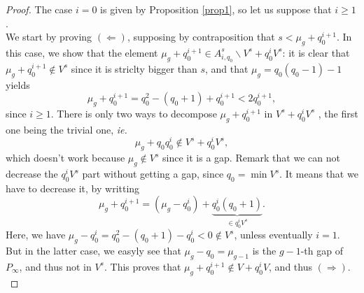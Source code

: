 \documentclass[a4paper]{article}
\begin{document}
\begin{proof} The case $i=0$ is given by Proposition \ref{prop1}, so let us suppose that $i \geq 1$. \\
We start by proving $(\Leftarrow)$, supposing by contraposition that $s < \mu_g + q_0^{i+1}$. In this case, we show that the element $\mu_g + q_0^{i+1} \in A^s_{i,q_0} \backslash V^s+q_0^iV^s$: it is clear that $\mu_g + q_0^{i+1} \notin V^s$ since it is striclty bigger than $s$, and that $\mu_g = q_0(q_0-1)-1$ yields
\[\mu_g + q_0^{i+1}=q_0^2-(q_0+1) + q_0^{i+1} < 2q_0^{i+1},\]
since $i \geq 1$. There is only two ways to decompose $\mu_g + q_0^{i+1}$ in $V^s+q_0^iV^s$ , the first one being the trivial one, \emph{ie.}
\[\mu_g + q_0q_0^{i} \notin V^s+q_0^iV^s,\]
which doesn't work because $\mu_g \notin V^s$ since it is a gap. Remark that we can not decrease the $q_0^iV^s$ part without getting a gap, since $q_0 = \min{V^s}$. It means that we have to decrease it, by writting 
\[\mu_g + q_0^{i+1} = (\mu_g - q_0^i) + \underbrace{q_0^i(q_0+1)}_{\in q^i_0V^s} .\]
Here, we have $\mu_g - q_0^i = q_0^2-(q_0+1)-q_0^i <0 \notin V^s$, unless eventually $i=1$. But in the latter case, we easyly see that $\mu_g-q_0 = \mu_{g-1}$ is the $g-1$-th gap of $P_{\infty}$, and thus not in $V^s$. This proves that $\mu_g + q_0^{i+1} \notin V+q_0^iV$, and thus $(\Rightarrow)$. \\


\end{proof}
\end{document}

